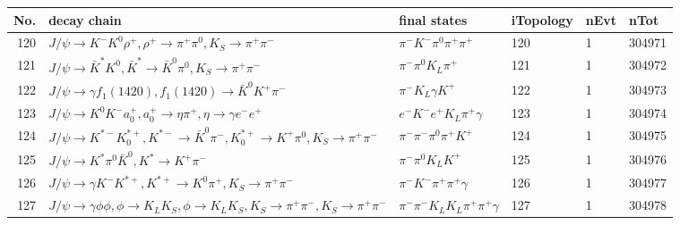 \begin{table}[htbp] 
\begin{center}
\begin{small}
\begin{tabular}{rlllll}\hline\hline
 No. & decay chain & final states &  iTopology & nEvt & nTot \\\hline
120&$J/\psi       \rightarrow K^{-}          K^{0}          \rho^{+}      , \rho^{+}       \rightarrow \pi^{+}        \pi^{0}        , K_{S}           \rightarrow \pi^{+}        \pi^{-}        $&$\pi^{-}        K^{-}          \pi^{0}        \pi^{+}        \pi^{+}        $&  120&    1&304971\\
121&$J/\psi       \rightarrow \bar{K}^{*}   K^{0}          , \bar{K}^{*}    \rightarrow \bar{K}^{0}   \pi^{0}        , K_{S}           \rightarrow \pi^{+}        \pi^{-}        $&$\pi^{-}        \pi^{0}        K_{L}          \pi^{+}        $&  121&    1&304972\\
122&$J/\psi       \rightarrow \gamma       f_{1}(1420)    , f_{1}(1420)     \rightarrow \bar{K}^{0}   K^{+}          \pi^{-}        $&$\pi^{-}        K_{L}          \gamma       K^{+}          $&  122&    1&304973\\
123&$J/\psi       \rightarrow K^{0}          K^{-}          a_{0}^{+}      , a_{0}^{+}       \rightarrow \eta          \pi^{+}        , \eta           \rightarrow \gamma       e^{-}        e^{+}        $&$e^{-}        K^{-}          e^{+}        K_{L}          \pi^{+}        \gamma       $&  123&    1&304974\\
124&$J/\psi       \rightarrow K^{*-}         K_{0}^{*+}     , K^{*-}          \rightarrow \bar{K}^{0}   \pi^{-}        , K_{0}^{*+}      \rightarrow K^{+}          \pi^{0}        , K_{S}           \rightarrow \pi^{+}        \pi^{-}        $&$\pi^{-}        \pi^{-}        \pi^{0}        \pi^{+}        K^{+}          $&  124&    1&304975\\
125&$J/\psi       \rightarrow K^{*}          \pi^{0}        \bar{K}^{0}   , K^{*}           \rightarrow K^{+}          \pi^{-}        $&$\pi^{-}        \pi^{0}        K_{L}          K^{+}          $&  125&    1&304976\\
126&$J/\psi       \rightarrow \gamma       K^{-}          K^{*+}         , K^{*+}          \rightarrow K^{0}          \pi^{+}        , K_{S}           \rightarrow \pi^{+}        \pi^{-}        $&$\pi^{-}        K^{-}          \pi^{+}        \pi^{+}        \gamma       $&  126&    1&304977\\
127&$J/\psi       \rightarrow \gamma       \phi           \phi           , \phi            \rightarrow K_{L}          K_{S}          , \phi            \rightarrow K_{L}          K_{S}          , K_{S}           \rightarrow \pi^{+}        \pi^{-}        , K_{S}           \rightarrow \pi^{+}        \pi^{-}        $&$\pi^{-}        \pi^{-}        K_{L}          K_{L}          \pi^{+}        \pi^{+}        \gamma       $&  127&    1&304978\\

\end{tabular}
\end{small}
\end{center}
\end{table}
